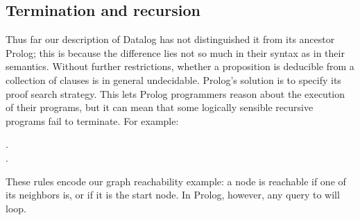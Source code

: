 

\subsection{Termination and recursion}

Thus far our description of Datalog has not distinguished it from its ancestor
Prolog; this is because the difference lies not so much in their syntax as in
their semantics.
%
Without further restrictions, whether a proposition is deducible from a
collection of clauses is in general undecidable.
%
Prolog's solution is to specify its proof search strategy.
%
This lets Prolog programmers reason about the execution of their programs, but
it can mean that some logically sensible recursive programs fail to terminate.
%
For example:

\label{datalog-reachable}
\begin{datalog}
   \gets {} \conj {}.\\
  .
\end{datalog}


\noindent
These rules encode our graph reachability example: a node is reachable if one of its neighbors is, or if it is the start node.
%
%
In Prolog, however, any query to  will loop.

